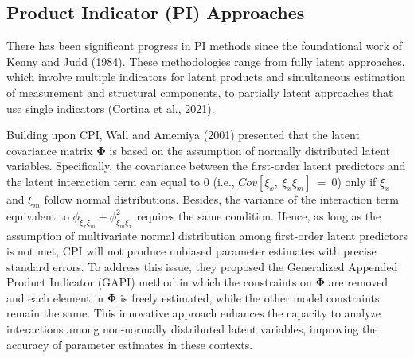 \documentclass[
  11pt,
  man]{apa6}
\begin{document}
\hypertarget{product-indicator-pi-approaches}{%
\subsection{Product Indicator (PI) Approaches}\label{product-indicator-pi-approaches}}

There has been significant progress in PI methods since the foundational work of Kenny and Judd (1984). These methodologies range from fully latent approaches, which involve multiple indicators for latent products and simultaneous estimation of measurement and structural components, to partially latent approaches that use single indicators (Cortina et al., 2021).

Building upon CPI, Wall and Amemiya (2001) presented that the latent covariance matrix \(\boldsymbol{\Phi}\) is based on the assumption of normally distributed latent variables. Specifically, the covariance between the first-order latent predictors and the latent interaction term can equal to 0 (i.e., \(Cov[\xi_{x}, \ \xi_{x}\xi_{m}] \ = \ 0\)) only if \(\xi_{x}\) and \(\xi_{m}\) follow normal distributions. Besides, the variance of the interaction term equivalent to \(\phi_{\xi_{x}\xi_{m}} + \phi_{\xi_{m}\xi_{x}}^2\) requires the same condition. Hence, as long as the assumption of multivariate normal distribution among first-order latent predictors is not met, CPI will not produce unbiased parameter estimates with precise standard errors. To address this issue, they proposed the Generalized Appended Product Indicator (GAPI) method in which the constraints on \(\boldsymbol{\Phi}\) are removed and each element in \(\boldsymbol{\Phi}\) is freely estimated, while the other model constraints remain the same. This innovative approach enhances the capacity to analyze interactions among non-normally distributed latent variables, improving the accuracy of parameter estimates in these contexts.
\end{document}
